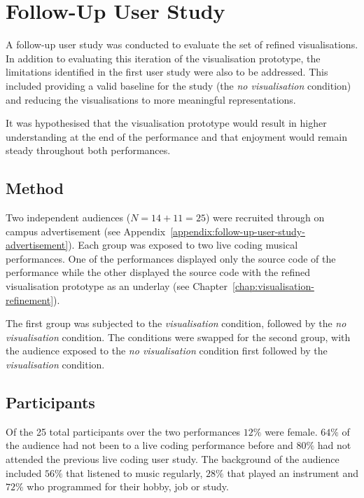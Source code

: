 
\chapter{Follow-Up User Study}
\label{chap:follow-up-user-study}

A follow-up user study was conducted to evaluate the set of refined visualisations. In addition to evaluating this iteration of the visualisation prototype, the limitations identified in the first user study were also to be addressed. This included providing a valid baseline for the study (the \emph{no visualisation} condition) and reducing the visualisations to more meaningful representations.


It was hypothesised that the visualisation prototype would result in higher understanding at the end of the performance and that enjoyment would remain steady throughout both performances.

\section{Method}

Two independent audiences ($N=14+11=25$) were recruited through on campus advertisement (see Appendix~\ref{appendix:follow-up-user-study-advertisement}). Each group was exposed to two live coding musical performances. One of the performances displayed only the source code of the performance while the other displayed the source code with the refined visualisation prototype as an underlay (see Chapter~\ref{chap:visualisation-refinement}).

The first group was subjected to the \emph{visualisation} condition, followed by the \emph{no visualisation} condition. The conditions were swapped for the second group, with the audience exposed to the \emph{no visualisation} condition first followed by the \emph{visualisation} condition.

\section{Participants}

Of the 25 total participants over the two performances $12\%$ were female. $64\%$ of the audience had not been to a live coding performance before and $80\%$ had not attended the previous live coding user study. The background of the audience included $56\%$ that listened to music regularly, $28\%$ that played an instrument and $72\%$ who programmed for their hobby, job or study.


